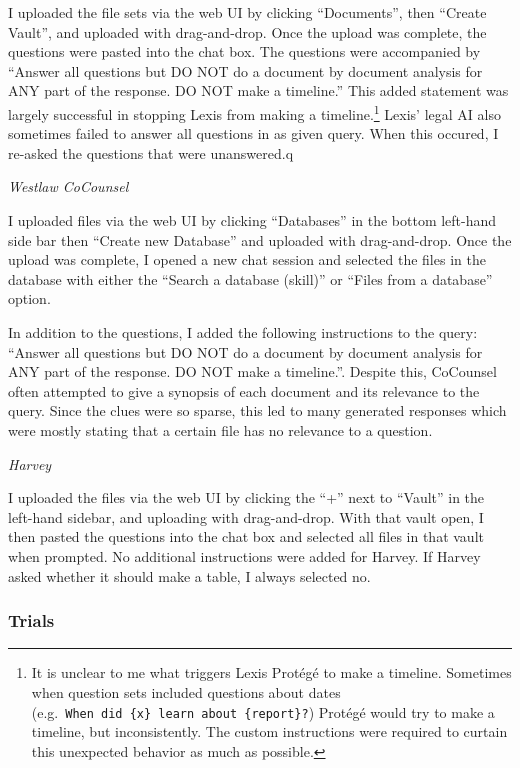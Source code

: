 \documentclass[
]{article}
\begin{document}
I uploaded the file sets via the web UI by clicking ``Documents'', then ``Create Vault'', and uploaded with drag-and-drop. Once the upload was complete, the questions were pasted into the chat box. The questions were accompanied by ``Answer all questions but DO NOT do a document by document analysis for ANY part of the response. DO NOT make a timeline.'' This added statement was largely successful in stopping Lexis from making a timeline.\footnote{It is unclear to me what triggers Lexis Protégé to make a timeline. Sometimes when question sets included questions about dates (e.g.~\texttt{When\ did\ \{x\}\ learn\ about\ \{report\}?}) Protégé would try to make a timeline, but inconsistently. The custom instructions were required to curtain this unexpected behavior as much as possible.} Lexis' legal AI also sometimes failed to answer all questions in as given query. When this occured, I re-asked the questions that were unanswered.q

\emph{Westlaw CoCounsel}

I uploaded files via the web UI by clicking ``Databases'' in the bottom left-hand side bar then ``Create new Database'' and uploaded with drag-and-drop. Once the upload was complete, I opened a new chat session and selected the files in the database with either the ``Search a database (skill)'' or ``Files from a database'' option.

In addition to the questions, I added the following instructions to the query: ``Answer all questions but DO NOT do a document by document analysis for ANY part of the response. DO NOT make a timeline.''. Despite this, CoCounsel often attempted to give a synopsis of each document and its relevance to the query. Since the clues were so sparse, this led to many generated responses which were mostly stating that a certain file has no relevance to a question.

\emph{Harvey}

I uploaded the files via the web UI by clicking the ``+'' next to ``Vault'' in the left-hand sidebar, and uploading with drag-and-drop. With that vault open, I then pasted the questions into the chat box and selected all files in that vault when prompted. No additional instructions were added for Harvey. If Harvey asked whether it should make a table, I always selected no.

\subsubsection{Trials}\label{trials}
\end{document}
